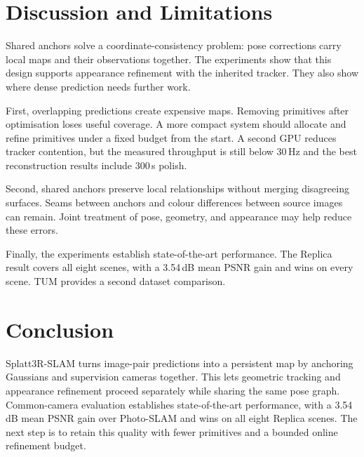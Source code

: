 \section{Discussion and Limitations}
Shared anchors solve a coordinate-consistency problem: pose corrections carry
local maps and their observations together. The experiments show that this
design supports appearance refinement with the inherited tracker. They also
show where dense prediction needs further work.

First, overlapping predictions create expensive maps. Removing primitives
after optimisation loses useful coverage. A more compact system should
allocate and refine primitives under a fixed budget from the start.
A second GPU reduces tracker contention, but the measured throughput is
still below 30\,Hz and the best reconstruction results include 300\,s polish.

Second, shared anchors preserve local relationships without merging
disagreeing surfaces. Seams between anchors and colour differences between
source images can remain. Joint treatment of pose, geometry, and appearance
may help reduce these errors.

Finally, the experiments establish state-of-the-art performance. The Replica
result covers all eight scenes, with a 3.54\,dB mean PSNR gain and wins on
every scene. TUM provides a second dataset comparison.

\section{Conclusion}
Splatt3R-SLAM turns image-pair predictions into a persistent map by anchoring
Gaussians and supervision cameras together. This lets geometric tracking
and appearance refinement proceed separately while sharing the same pose
graph. Common-camera evaluation establishes state-of-the-art performance,
with a 3.54\,dB mean PSNR gain over Photo-SLAM and wins on all eight Replica
scenes. The next step is to retain this quality with fewer primitives and a
bounded online refinement budget.
